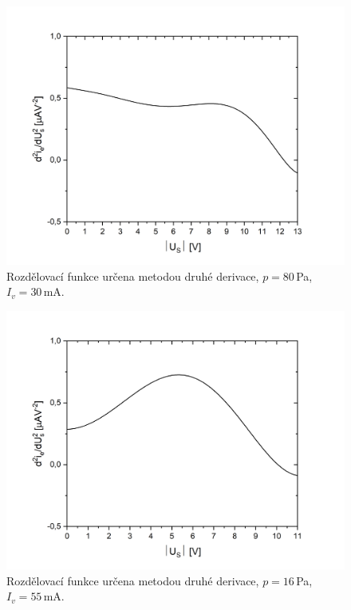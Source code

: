 \documentclass[a4paper,12pt]{article}
\begin{document}
\begin{figure}[h!]
	\centering
	\includegraphics[width=135mm]{rozdeleniD2G2.png}
	\caption{Rozdělovací funkce určena metodou druhé derivace, 
		$p=80$\,\si{\pascal}, $I_v = 30$\,\si{\milli\ampere}.}
	\label{rozdeleniD2G2}
\end{figure}

\begin{figure}[h!]
	\centering
	\includegraphics[width=135mm]{rozdeleniD2G3.png}
	\caption{Rozdělovací funkce určena metodou druhé derivace, 
		$p=16$\,\si{\pascal}, $I_v = 55$\,\si{\milli\ampere}.}
	\label{rozdeleniD2G3}
\end{figure}
\end{document}
